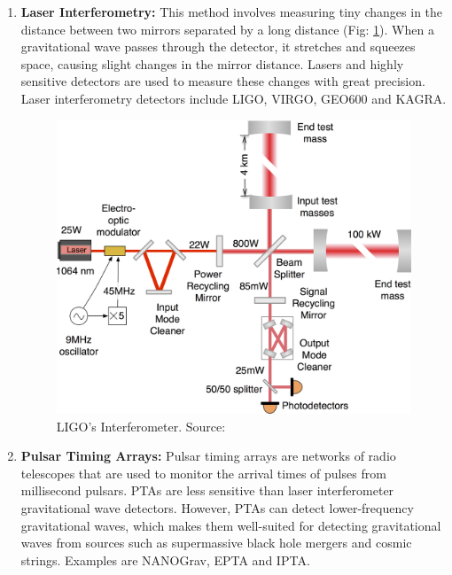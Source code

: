 \begin{enumerate}
    \item \textbf{Laser Interferometry:} This method involves measuring tiny changes in the distance between two mirrors separated by a long distance (Fig: \ref{fig:interferometer}). When a gravitational wave passes through the detector, it stretches and squeezes space, causing slight changes in the mirror distance. Lasers and highly sensitive detectors are used to measure these changes with great precision. Laser interferometry detectors include LIGO, VIRGO, GEO600 and KAGRA.
    \begin{figure}
        \centering
        \includegraphics[width=0.65\linewidth]{images_/interferometer.png}
        \caption{LIGO's Interferometer. Source: \citep{PhysRevD.93.112004}}
        \label{fig:interferometer}
    \end{figure}
    
    \item \textbf{Pulsar Timing Arrays:} Pulsar timing arrays are networks of radio telescopes that are used to monitor the arrival times of pulses from millisecond pulsars. PTAs are less sensitive than laser interferometer gravitational wave detectors. However, PTAs can detect lower-frequency gravitational waves, which makes them well-suited for detecting gravitational waves from sources such as supermassive black hole mergers and cosmic strings. Examples are NANOGrav, EPTA and IPTA.
    
\end{enumerate}
